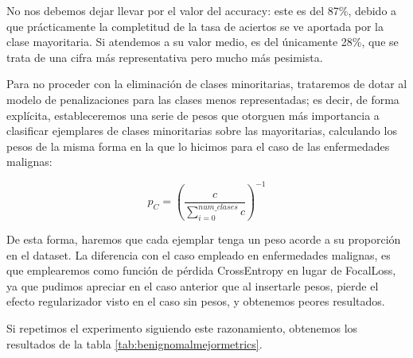 No nos debemos dejar llevar por el valor del accuracy: este es del 87\%, debido a que prácticamente la completitud de la tasa de aciertos se ve aportada por la clase mayoritaria. Si atendemos a su valor medio, es del únicamente 28\%, que se trata de una cifra más representativa pero mucho más pesimista.

Para no proceder con la eliminación de clases minoritarias, trataremos de dotar al modelo de penalizaciones para las clases menos representadas; es decir, de forma explícita, estableceremos una serie de pesos que otorguen más importancia a clasificar ejemplares de clases minoritarias sobre las mayoritarias, calculando los pesos de la misma forma en la que lo hicimos para el caso de las enfermedades malignas:

$$p_C =(\frac{c}{\sum_{i=0}^{num\_clases} c} )^{-1}$$

De esta forma, haremos que cada ejemplar tenga un peso acorde a su proporción en el dataset. La diferencia con el caso empleado en enfermedades malignas, es que emplearemos como función de pérdida CrossEntropy en lugar de FocalLoss, ya que pudimos apreciar en el caso anterior que al insertarle pesos, pierde el efecto regularizador visto en el caso sin pesos, y obtenemos peores resultados.

Si repetimos el experimento siguiendo este razonamiento, obtenemos los resultados de la tabla \ref{tab:benignomalmejormetrics}.



